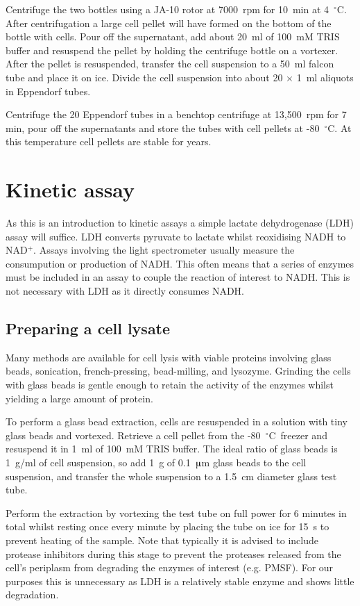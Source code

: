 \documentclass[a4paper]{article}
\newcommand{\dc}{~$^{\circ}$C}
\newcommand{\micro}{$\muup$}
\begin{document}
\begin{multicols}{2}
Centrifuge the two bottles using a JA-10 rotor at 7000~rpm for 10~min at 4\dc.
After centrifugation a large cell pellet will have formed on the bottom of the
bottle with cells. Pour off the supernatant, add about 20~ml of 100~mM TRIS buffer and
resuspend the pellet by holding the centrifuge bottle on a vortexer. After the
pellet is resuspended, transfer the cell suspension to a 50~ml falcon tube and
place it on ice. Divide the cell suspension into about 20 $\times$ 1~ml
aliquots in Eppendorf tubes.

Centrifuge the 20 Eppendorf tubes in a benchtop centrifuge at 13,500~rpm for 7
min, pour off the supernatants and store the tubes with cell pellets at -80\dc.
At this temperature cell pellets are stable for years.

\section{Kinetic assay} As this is an introduction to kinetic assays a simple
lactate dehydrogenase (LDH) assay will suffice. LDH converts pyruvate to
lactate whilst reoxidising NADH to NAD$^+$. Assays involving the light
spectrometer usually measure the consumpution or production of NADH. This often
means that a series of enzymes must be included in an assay to couple the
reaction of interest to NADH. This is not necessary with LDH as it directly
consumes NADH.

\subsection{Preparing a cell lysate}

Many methods are available for cell lysis with viable proteins involving glass
beads, sonication, french-pressing, bead-milling, and lysozyme. Grinding the
cells with glass beads is gentle enough to retain the activity of the enzymes
whilst yielding a large amount of protein.

To perform a glass bead extraction, cells are resuspended in a solution with
tiny glass beads and vortexed. Retrieve a cell pellet from the -80\dc\ freezer
and resuspend it in 1~ml of 100~mM TRIS buffer. The ideal ratio of glass beads
is 1~g/ml of cell suspension, so add 1~g of 0.1~\micro m glass beads to the
cell suspension, and transfer the whole suspension to a 1.5~cm diameter glass
test tube.

Perform the extraction by vortexing the test tube on full power for 6 minutes
in total whilst resting once every minute by placing the tube on ice for 15~s
to prevent heating of the sample. Note that typically it is advised to include
protease inhibitors during this stage to prevent the proteases released from
the cell's periplasm from degrading the enzymes of interest (e.g. PMSF). For
our purposes this is unnecessary as LDH is a relatively stable enzyme and shows
little degradation.


\end{multicols}
\end{document}
